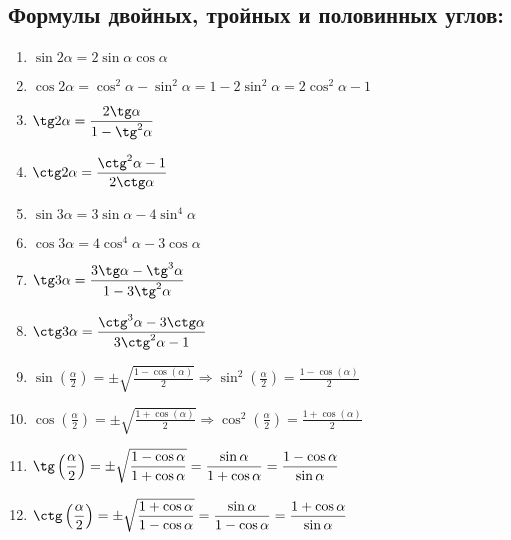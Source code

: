 \documentclass[12pt, a6paper]{extarticle}
\begin{document}
\subsection{Формулы двойных, тройных и половинных углов:}
\begin{enumerate}
	\item $\sin 2\alpha = 2\sin \alpha \cos \alpha$
	\item $\cos 2\alpha = \cos^2 \alpha - \sin^2 \alpha = 1-2\sin^2 \alpha = 2\cos^2 \alpha - 1$
	\item $\tg 2 \alpha = \displaystyle \frac{2\tg \alpha}{1-\tg^2 \alpha}$
	\item $\ctg 2 \alpha = \displaystyle \frac{\ctg^2 \alpha-1}{2\ctg \alpha}$
	\item $\sin 3\alpha = 3\sin \alpha - 4 \sin^4 \alpha$
	\item $\cos 3\alpha = 4\cos^4 \alpha - 3 \cos \alpha$
	\item $\tg 3\alpha = \displaystyle \frac{3\tg \alpha - \tg^3\alpha}{1-3\tg^2\alpha}$
	\item $\ctg 3 \alpha =\displaystyle \frac{\ctg^3\alpha-3\ctg \alpha}{3\ctg ^2 \alpha -1}$
	\item $\sin \left(\displaystyle\frac{\alpha}{2}\right) = \pm \sqrt{\displaystyle \frac{1-\cos(\alpha)}{2}} \Rightarrow \sin^2\left(\displaystyle\frac{\alpha}{2}\right) = \displaystyle \frac{1-\cos(\alpha)}{2} $
	\item $\cos \left(\displaystyle\frac{\alpha}{2}\right) = \pm \sqrt{\displaystyle \frac{1+\cos(\alpha)}{2}} \Rightarrow \cos^2\left(\displaystyle\frac{\alpha}{2}\right) = \displaystyle \frac{1+\cos(\alpha)}{2} $
	\item $\tg \left(\displaystyle\frac{\alpha}{2}\right) = \pm \sqrt{\displaystyle\frac{1-\cos \alpha}{1+\cos \alpha}} = \displaystyle\frac{\sin \alpha}{1+\cos \alpha} = \frac{1-\cos \alpha}{\sin \alpha}$
	\item $\ctg \left(\displaystyle\frac{\alpha}{2}\right) = \pm \sqrt{\displaystyle\frac{1+\cos \alpha}{1-\cos \alpha}} = \displaystyle\frac{\sin \alpha}{1-\cos \alpha} = \frac{1+\cos \alpha}{\sin \alpha}$
\end{enumerate}
\end{document}
